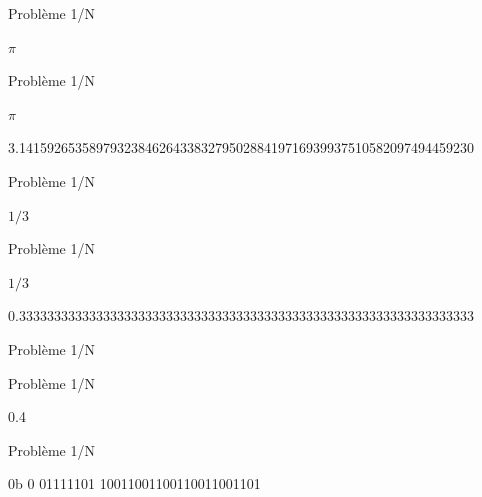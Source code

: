 \documentclass{beamer}
\begin{document}
  \begin{frame}{Problème 1/N} 
    \begin{center}
      \fontsize{100}{110}\selectfont $\pi$ 
    \end{center}
  \end{frame}
  
  \begin{frame}{Problème 1/N} 
    \begin{center}
      \fontsize{100}{110}\selectfont $\pi$ 
    \end{center}
    \begin{center}
      3.14159265358979323846264338327950288419716939937510582097494459230
    \end{center}
  \end{frame}
  
  \begin{frame}{Problème 1/N} 
    \begin{center}
      \fontsize{100}{110}\selectfont $1/3$
    \end{center}
  \end{frame}
  
  \begin{frame}{Problème 1/N} 
    \begin{center}
      \fontsize{100}{110}\selectfont $1/3$
    \end{center}
    \begin{center}
      0.33333333333333333333333333333333333333333333333333333333333333333
    \end{center}
  \end{frame}
  
    \begin{frame}{Problème 1/N} 
    \begin{center}
      \fontsize{100}{110}\selectfont{$0.4$}
    \end{center}
  \end{frame}
  
  \begin{frame}{Problème 1/N} 
    \begin{center}
      \fontsize{100}{110}\selectfont{$0.4$}
    \end{center}
    \begin{center}
      0.4
    \end{center}
  \end{frame}
  
  \begin{frame}{Problème 1/N} 
    \begin{center}
      \fontsize{100}{110}\selectfont{$0.4$}
    \end{center}
    \begin{center}
      0b \textcolor{SignColor}{0} \textcolor{ExponentColor}{01111101} \textcolor{FractionColor}{10011001100110011001101}
    \end{center}
  \end{frame}
  
\end{document}
